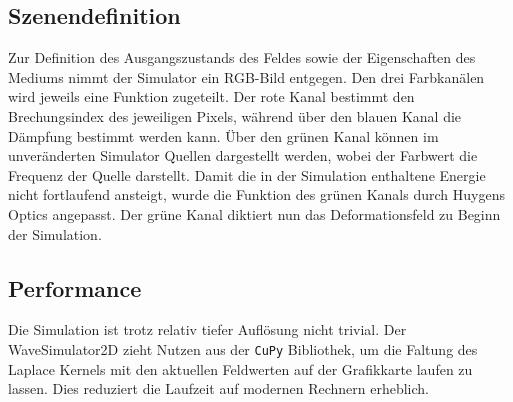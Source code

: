 \subsection{Szenendefinition}
Zur Definition des Ausgangszustands des Feldes sowie der Eigenschaften des Mediums nimmt der Simulator ein RGB-Bild entgegen.
Den drei Farbkanälen wird jeweils eine Funktion zugeteilt.
Der rote Kanal bestimmt den Brechungsindex des jeweiligen Pixels, während über den blauen Kanal die Dämpfung bestimmt werden kann.
Über den grünen Kanal können im unveränderten Simulator Quellen dargestellt werden, wobei der Farbwert die Frequenz der Quelle darstellt.
Damit die in der Simulation enthaltene Energie nicht fortlaufend ansteigt, wurde die Funktion des grünen Kanals durch Huygens Optics angepasst.
Der grüne Kanal diktiert nun das Deformationsfeld zu Beginn der Simulation.

\subsection{Performance}
Die Simulation ist trotz relativ tiefer Auflösung nicht trivial. 
Der WaveSimulator2D zieht Nutzen aus der \texttt{CuPy} Bibliothek, um die Faltung des Laplace Kernels mit den aktuellen Feldwerten auf der Grafikkarte laufen zu lassen.
Dies reduziert die Laufzeit auf modernen Rechnern erheblich.
